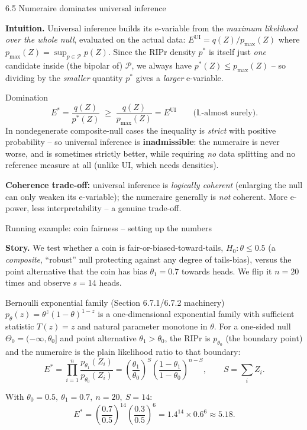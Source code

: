 \documentclass[aspectratio=169,10pt]{beamer}
\newcommand{\cP}{\mathcal{P}}
\begin{document}
\begin{frame}{6.5 Numeraire dominates universal inference}

\textbf{Intuition.} Universal inference builds its e-variable from the
\emph{maximum likelihood over the whole null}, evaluated on the actual
data: $E^{\mathrm{UI}} = q(Z)/p_{\max}(Z)$ where
$p_{\max}(Z) = \sup_{p\in\cP} p(Z)$. Since the RIPr density $p^*$ is
itself just \emph{one} candidate inside (the bipolar of) $\cP$, we
always have $p^*(Z) \le p_{\max}(Z)$ -- so dividing by the
\emph{smaller} quantity $p^*$ gives a \emph{larger} e-variable.

\begin{block}{Domination}
\[
E^* = \frac{q(Z)}{p^*(Z)} \;\ge\; \frac{q(Z)}{p_{\max}(Z)} = E^{\mathrm{UI}}
\qquad \text{($\mathbb{L}$-almost surely)}.
\]
In nondegenerate composite-null cases the inequality is \emph{strict}
with positive probability -- so universal inference is
\textbf{inadmissible}: the numeraire is never worse, and is sometimes
strictly better, while requiring \emph{no} data splitting and no
reference measure at all (unlike UI, which needs densities).
\end{block}

\textbf{Coherence trade-off:} universal inference is \emph{logically
coherent} (enlarging the null can only weaken its e-variable); the
numeraire generally is \emph{not} coherent. More e-power, less
interpretability -- a genuine trade-off.
\end{frame}

\begin{frame}{Running example: coin fairness -- setting up the numbers}

\textbf{Story.} We test whether a coin is fair-or-biased-toward-tails,
$H_0: \theta \le 0.5$ (a \emph{composite}, ``robust'' null protecting
against any degree of tails-bias), versus the point alternative that
the coin has bias $\theta_1 = 0.7$ towards heads. We flip it $n=20$
times and observe $s=14$ heads.

\begin{block}{Bernoulli exponential family (Section 6.7.1/6.7.2 machinery)}
$p_\theta(z) = \theta^{z}(1-\theta)^{1-z}$ is a one-dimensional
exponential family with sufficient statistic $T(z)=z$ and natural
parameter monotone in $\theta$. For a one-sided null
$\Theta_0 = (-\infty,\theta_0]$ and point alternative $\theta_1>\theta_0$,
the RIPr is $p_{\theta_0}$ (the boundary point) and the numeraire is the
plain likelihood ratio to that boundary:
\[
E^* = \prod_{i=1}^n \frac{p_{\theta_1}(Z_i)}{p_{\theta_0}(Z_i)}
= \left(\frac{\theta_1}{\theta_0}\right)^{S}\left(\frac{1-\theta_1}{1-\theta_0}\right)^{n-S},
\qquad S = \textstyle\sum_i Z_i.
\]
\end{block}

With $\theta_0=0.5,\ \theta_1=0.7,\ n=20,\ S=14$:
\[
E^* = \left(\frac{0.7}{0.5}\right)^{14}\left(\frac{0.3}{0.5}\right)^{6}
= 1.4^{14}\times 0.6^{6} \approx 5.18.
\]
\end{frame}
\end{document}
